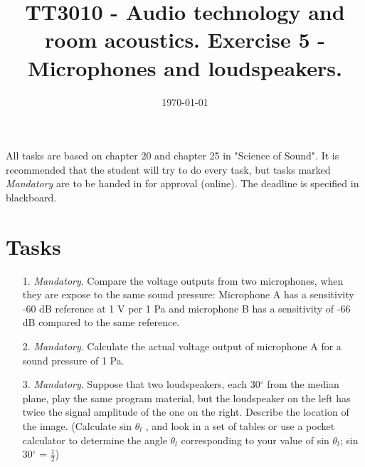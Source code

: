 \documentclass{article}
\title{TT3010 - Audio technology and room acoustics. \newline Exercise 5 - Microphones and loudspeakers.}
\date{\today}
\begin{document}
\maketitle

All tasks are based on chapter 20 and chapter 25 in "Science of Sound". 
It is recommended that the student will try to do every task, but tasks marked \textit{Mandatory} are to be handed in for approval (online). The deadline is specified in blackboard.

\section*{Tasks}
\begin{itemize}
    \item [1.] \emph{Mandatory}. Compare the voltage outputs from two microphones, when they are expose to the same sound pressure: Microphone A has a sensitivity -60 dB reference at 1 V per 1 Pa and microphone B has a sensitivity of -66 dB compared to the same reference. 
  
        
    \item[2.] \emph{Mandatory}. Calculate the actual voltage output of microphone A for a sound pressure of 1 Pa.
    
    \item[3.] \emph{Mandatory}. Suppose that two loudspeakers, each 30$^\circ$ from the median plane, play the same program material, but the loudspeaker on the left has twice the signal amplitude of the one on the right. Describe the location of the image. (Calculate sin $\theta_l$ , and look in a set of tables or use a pocket calculator to determine the angle $\theta_l$ corresponding to your value of sin $\theta_l$; sin 30$^\circ$ = $\frac{1}{2}$)

        
    
    

\end{itemize}

\end{document}

